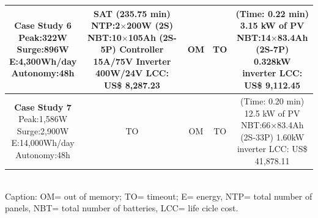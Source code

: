 \documentclass[runningheads]{llncs}
\begin{document}
\begin{table}[!t]
\begin{tabular}{|c|c|c|c|c|}
\makecell{\textbf{Case Study 6}\\Peak:322W\\Surge:896W\\E:4,300Wh/day\\Autonomy:48h} &  \makecell {SAT (235.75 min) \\NTP:2$\times$200W (2S)\\NBT:10$\times$105Ah (2S-5P)\\Controller 15A/75V\\Inverter 400W/24V \\LCC: US\$ 8,287.23} & OM & TO & \makecell{(Time: 0.22 min)\\3.15 kW of PV\\NBT:14$\times$83.4Ah (2S-7P)\\0.328kW inverter\\LCC: US\$ 9,112.45} \\
\hline
\makecell{\textbf{Case Study 7}\\Peak:1,586W\\Surge:2,900W\\E:14,000Wh/day\\Autonomy:48h} & TO & OM & TO & \makecell{(Time: 0.20 min)\\12.5 kW of PV\\NBT:66$\times$83.4Ah (2S-33P)\\1.60kW inverter\\LCC: US\$ 41,878.11} \\
\hline
\hline
\end{tabular}
\\Caption: OM= out of memory; TO= timeout; E= energy, NTP= total number of panels, NBT= total number of batteries, LCC= life cicle cost.
\end{table}

%
%


%
\end{document}

